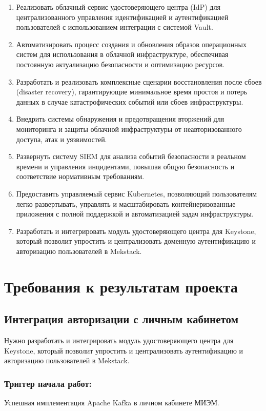 \documentclass[14pt, a4paper]{extarticle}
\begin{document}
\begin{enumerate}
\item Реализовать облачный сервис удостоверяющего центра (IdP) для централизованного управления идентификацией и аутентификацией пользователей с использованием интеграции с системой Vault.
\item Автоматизировать процесс создания и обновления образов операционных систем для использования в облачной инфраструктуре, обеспечивая постоянную актуализацию безопасности и оптимизацию ресурсов.
\item Разработать и реализовать комплексные сценарии восстановления после сбоев (disaster recovery), гарантирующие минимальное время простоя и потерь данных в случае катастрофических событий или сбоев инфраструктуры.
\item Внедрить системы обнаружения и предотвращения вторжений для мониторинга и защиты облачной инфраструктуры от неавторизованного доступа, атак и уязвимостей.
\item Развернуть систему SIEM для анализа событий безопасности в реальном времени и управления инцидентами, повышая общую безопасность и соответствие нормативным требованиям.
\item Предоставить управляемый сервис Kubernetes, позволяющий пользователям легко развертывать, управлять и масштабировать контейнеризованные приложения с полной поддержкой и автоматизацией задач инфраструктуры.
\item Разработать и интегрировать модуль удостоверяющего центра для Keystone, который позволит упростить и централизовать доменную аутентификацию и авторизацию пользователей в Mekstack.
\end{enumerate}

\section{Требования к результатам проекта}

\subsection{Интеграция авторизации с личным кабинетом}

Нужно разработать и интегрировать модуль удостоверяющего центра для Keystone, который позволит упростить и централизовать аутентификацию и авторизацию пользователей в Mekstack.

\subsubsection*{Триггер начала работ:}
Успешная имплементация Apache Kafka в личном кабинете МИЭМ.
\end{document}
